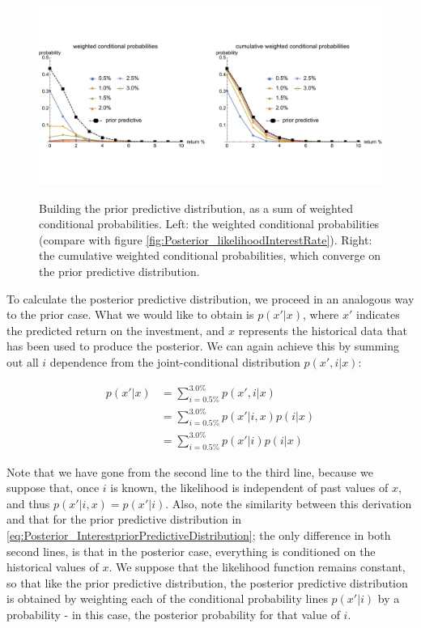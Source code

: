 \documentclass[11pt,fullpage]{book}
\begin{document}
\begin{figure}
\centering
\scalebox{0.4} 
{\includegraphics{Posterior_priorBuildInterestRate.pdf}}
\caption{Building the prior predictive distribution, as a sum of weighted conditional probabilities. Left: the weighted conditional probabilities (compare with figure \ref{fig:Posterior_likelihoodInterestRate}). Right: the cumulative weighted conditional probabilities, which converge on the prior predictive distribution.}\label{fig:Posterior_priorBuildInterestRate}
\end{figure}

To calculate the posterior predictive distribution, we proceed in an analogous way to the prior case. What we would like to obtain is $p(x'|x)$, where $x'$ indicates the predicted return on the investment, and $x$ represents the historical data that has been used to produce the posterior. We can again achieve this by summing out all $i$ dependence from the joint-conditional distribution $p(x',i|x)$:


\begin{align}
p(x'|x) &= \sum\limits_{i=0.5\%}^{3.0\%} p(x',i|x)\\
&= \sum\limits_{i=0.5\%}^{3.0\%} p(x'|i,x) p(i|x)\\
&= \sum\limits_{i=0.5\%}^{3.0\%} p(x'|i) p(i|x)
\end{align}

Note that we have gone from the second line to the third line, because we suppose that, once $i$ is known, the likelihood is independent of past values of $x$, and thus $p(x'|i,x)=p(x'|i)$. Also, note the similarity between this derivation and that for the prior predictive distribution in \ref{eq:Posterior_InterestpriorPredictiveDistribution}; the only difference in both second lines, is that in the posterior case, everything is conditioned on the historical values of $x$. We suppose that the likelihood function remains constant, so that like the prior predictive distribution, the posterior predictive distribution is obtained by weighting each of the conditional probability lines $p(x'|i)$ by a probability - in this case, the posterior probability for that value of $i$. 
\end{document}
